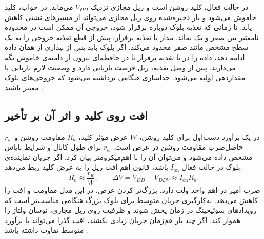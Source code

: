 در حالت فعال، کلید روشن است و ریل مجازی نزدیک \(V_{DD}\) می‌ماند.
در خواب، کلید خاموش می‌شود و بار ذخیره‌شده روی ریل مجازی می‌تواند
از مسیرهای نشتی کاهش یابد. تا زمانی که تغذیه بلوک دوباره برقرار شود،
خروجی آن ممکن است در محدوده نامعتبر بین صفر و یک بماند. مدار
 با تغذیه برقرار، پیش از قطع تغذیه خروجی را
به یک سطح مشخص مانند صفر محدود می‌کند. اگر بلوک باید پس از بیداری
از همان داده ادامه دهد، داده را در  با تغذیه
برقرار یا در حافظه‌ای بیرون از دامنه‌ی خاموش نگه می‌دارند. پس از
وصل تغذیه، ریل فرصت بازیابی دارد و وضعیت لازم بازیابی یا مقداردهی
اولیه می‌شود. جداسازی هنگامی برداشته می‌شود که خروجی‌های بلوک معتبر
باشند \cite[بخش ، صفحات ۱۹۷ تا ۱۹۹]{weste}.

\subsection{افت روی کلید و اثر آن بر تأخیر}
\label{sec:power-header-delay}

در یک برآورد دست‌اول برای کلید روشن، \(W\) عرض مؤثر کلید،
\(R_h\) مقاومت روشن و \(r_w\) حاصل‌ضرب مقاومت روشن در عرض است.
\(r_w\) برای طول کانال و شرایط بایاس مشخص داده می‌شود و می‌توان آن
را با اهم‌میکرومتر بیان کرد. اگر جریان نماینده‌ی بلوک در حالت فعال
\(I_{\mathrm{on}}\) باشد، قانون اهم افت ریل را به عرض کلید ربط می‌دهد.
\begin{equation}
  R_h\approx\frac{r_w}{W},\qquad
  \Delta V=V_{DD}-V_{DDV}\approx I_{\mathrm{on}}R_h.
  \label{eq:power-header-droop}
\end{equation}
ضرب آمپر در اهم واحد ولت دارد. بزرگ‌تر کردن عرض، در این مدل
مقاومت و افت را کاهش می‌دهد. به‌کارگیری جریان متوسط برای بلوک بزرگ
هنگامی مناسب‌تر است که رویدادهای سوئیچینگ در زمان پخش شوند و ظرفیت
روی ریل مجازی، نوسان ولتاژ را هموار کند. اگر چند بار هم‌زمان جریان
زیادی بکشند، افت گذرا می‌تواند با برآورد متوسط تفاوت داشته باشد
\cite[بخش ، صفحات ۱۹۸ و ۱۹۹]{weste}.

